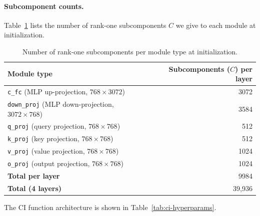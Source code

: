 \documentclass{article}
\begin{document}
\paragraph{Subcomponent counts.}
Table~\ref{tab:vpd-subcomponent-counts} lists the number of rank-one subcomponents $C$ we give to each module at initialization.

\begin{table}[h]
\centering
\begin{tabular}{lr}
\toprule
\textbf{Module type} & \textbf{Subcomponents ($C$) per layer} \\
\midrule
\texttt{c\_fc} (MLP up-projection, $768 \times 3072$) & 3072 \\
\texttt{down\_proj} (MLP down-projection, $3072 \times 768$) & 3584 \\
\texttt{q\_proj} (query projection, $768 \times 768$) & 512 \\
\texttt{k\_proj} (key projection, $768 \times 768$) & 512 \\
\texttt{v\_proj} (value projection, $768 \times 768$) & 1024 \\
\texttt{o\_proj} (output projection, $768 \times 768$) & 1024 \\
\midrule
\textbf{Total per layer} & 9984 \\
\textbf{Total (4 layers)} & 39{,}936 \\
\bottomrule
\end{tabular}
\caption{Number of rank-one subcomponents per module type at initialization.}
\label{tab:vpd-subcomponent-counts}
\end{table}

The CI function architecture is shown in Table~\ref{tab:ci-hyperparams}.
\end{document}
